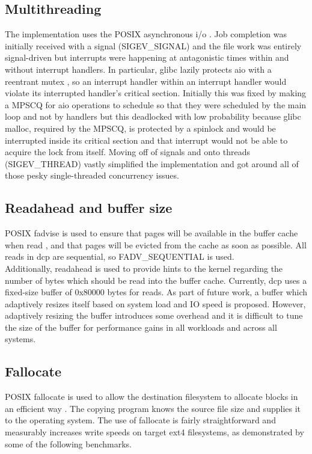 \documentclass[12pt]{article}
\begin{document}
\subsection{Multithreading}
The implementation uses the POSIX asynchronous i/o \cite{aio}. Job completion was initially
received with a signal (SIGEV\_SIGNAL) and the file work was entirely signal-driven
but interrupts were happening at antagonistic times within and without interrupt
handlers. In particular, glibc lazily protects aio with a reentrant mutex \cite{aio_read}, so an
interrupt handler within an interrupt handler would violate its interrupted handler's
critical section. Initially this was fixed by making a MPSCQ for aio operations to schedule
so that they were scheduled by the main loop and not by handlers but this deadlocked with low
probability because glibc malloc, required by the MPSCQ, is protected by a spinlock \cite{malloc} and
would be interrupted inside its critical section and that interrupt would not be
able to acquire the lock from itself. Moving off of signals and onto threads (SIGEV\_THREAD)
vastly simplified the implementation and got around all of those pesky single-threaded
concurrency issues. \\

\subsection{Readahead and buffer size}
POSIX fadvise is used to ensure that pages will be available
in the buffer cache when read \cite{fadvise}, and that pages will be evicted from
the cache as soon as possible. All reads in dcp are
sequential, so FADV\_SEQUENTIAL is used. \\

Additionally, readahead is used to provide hints to the kernel
regarding the number of bytes which should be read into the buffer cache.
Currently, dcp uses a fixed-size buffer of 0x80000 bytes for reads.
As part of future work, a buffer which adaptively resizes itself based on system
load and IO speed is proposed. However, adaptively resizing the buffer introduces
some overhead and it is difficult to tune the size of the buffer for performance gains
in all workloads and across all systems. \\%

\subsection{Fallocate}
POSIX fallocate is used to allow the destination filesystem to
allocate blocks in an efficient way \cite{fallocate}. The copying program knows
the source file size and supplies it to the operating system.
The use of fallocate is fairly straightforward and measurably
increases write speeds on target ext4 filesystems, as demonstrated
by some of the following benchmarks. \\
\end{document}
